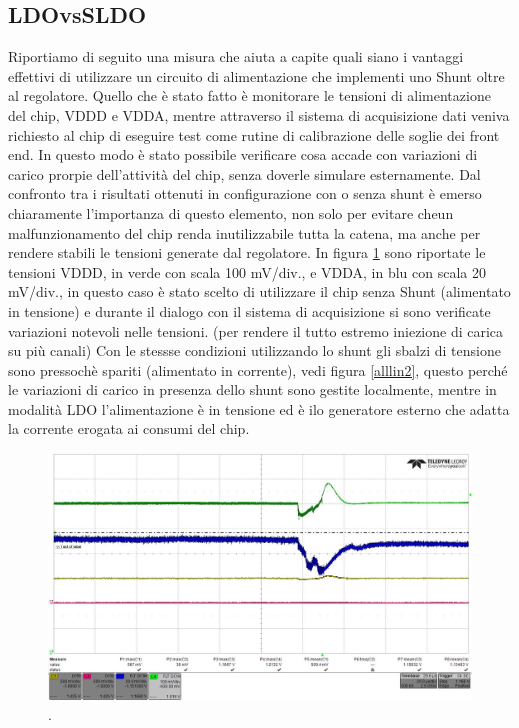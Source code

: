\subsection{LDOvsSLDO}
Riportiamo di seguito una misura che aiuta a capite quali siano i vantaggi effettivi di utilizzare un circuito di alimentazione che implementi uno Shunt oltre al regolatore. Quello che è stato fatto è monitorare le tensioni di alimentazione del chip, VDDD e VDDA, mentre attraverso il sistema di acquisizione dati veniva richiesto al chip di eseguire test come rutine di calibrazione delle soglie dei front end. 
In questo modo è stato possibile verificare cosa accade con variazioni di carico prorpie dell'attività del chip, senza doverle simulare esternamente. 
Dal confronto tra i risultati ottenuti in configurazione con o senza shunt è emerso chiaramente l'importanza di questo elemento, non solo per evitare cheun malfunzionamento del chip renda inutilizzabile tutta la catena, ma anche per rendere stabili le tensioni generate dal regolatore. 
In figura \ref{alllin1} sono riportate le tensioni VDDD, in verde con scala 100 mV/div., e VDDA, in blu con scala 20 mV/div., in questo caso è stato scelto di utilizzare il chip senza Shunt (alimentato in tensione) e durante il dialogo con il sistema di acquisizione si sono verificate variazioni notevoli nelle tensioni. (per rendere il tutto estremo iniezione di carica su più canali) Con le stessse condizioni utilizzando lo shunt gli sbalzi di tensione sono pressochè spariti (alimentato in corrente), vedi figura \ref{alllin2}, questo perché le variazioni di carico in presenza dello shunt sono gestite localmente, mentre in modalità LDO l'alimentazione è in tensione ed è ilo generatore esterno che adatta la corrente erogata ai consumi del chip.
\begin{figure}
\centering
\includegraphics[scale=.3]{Immagini/alllin1}
\caption{.}
\label{alllin1}
\end{figure}



